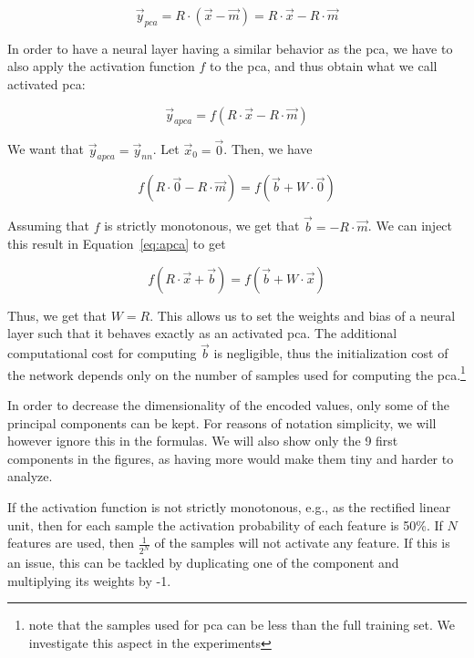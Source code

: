 \documentclass[conference]{IEEEtran}
\begin{document}
\begin{equation}\label{eq:pca}
  \vec{y}_{pca} = R \cdot \left(\vec{x} - \vec{m}\right) = R\cdot \vec{x} - R\cdot \vec{m}
\end{equation}

In order to have a neural layer having a similar behavior as the \ac{pca}, we have to also apply the activation function $f$ to the \ac{pca}, and thus obtain what we call activated \ac{pca}:

\begin{equation}\label{eq:apca}
  \vec{y}_{apca} = f\left(R\cdot \vec{x} - R\cdot \vec{m}\right)
\end{equation}

We want that $\vec{y}_{apca} = \vec{y}_{nn}$.
Let $\vec{x}_0 = \vec{0}$.
Then, we have

\begin{equation}
  f\left(R\cdot \vec{0} - R\cdot \vec{m}\right) = f\left(\vec{b}+W\cdot \vec{0}\right)
\end{equation}

Assuming that $f$ is strictly monotonous, we get that $\vec{b} = -R\cdot \vec{m}$.
We can inject this result in Equation~\ref{eq:apca} to get

\begin{equation}
  f\left(R\cdot \vec{x} + \vec{b}\right) = f\left(\vec{b} + W\cdot \vec{x}\right)
\end{equation}

Thus, we get that $W = R$.
This allows us to set the weights and bias of a neural layer such that it behaves exactly as an activated \ac{pca}.
The additional computational cost for computing $\vec{b}$ is negligible, thus the initialization cost of the network depends only on the number of samples used for computing the \ac{pca}.\footnote{note that the samples used for \ac{pca} can be less than the full training set. We investigate this aspect in the experiments}

In order to decrease the dimensionality of the encoded values, only some of the principal components can be kept.
For reasons of notation simplicity, we will however ignore this in the formulas.
We will also show only the 9 first components in the figures, as having more would make them tiny and harder to analyze.

If the activation function is not strictly monotonous, e.g., as the rectified linear unit, then for each sample the activation probability of each feature is 50\%.
If $N$ features are used, then $\frac{1}{2^N}$ of the samples will not activate any feature.
If this is an issue, this can be tackled by duplicating one of the component and multiplying its weights by -1.
\end{document}
